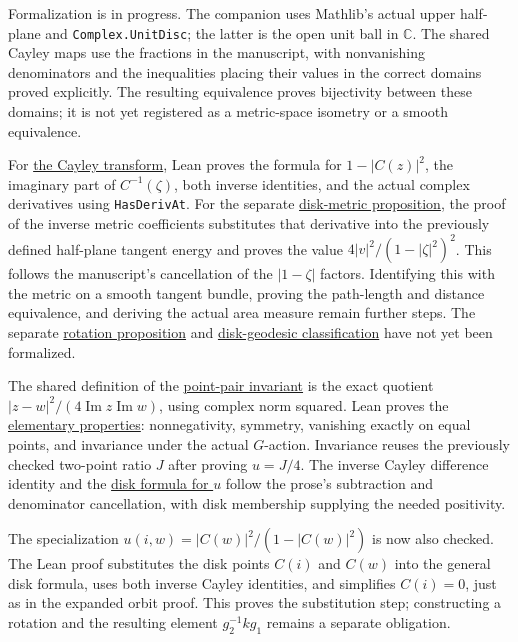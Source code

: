 Formalization is in progress. The companion uses Mathlib's actual upper half-plane and \texttt{Complex.UnitDisc}; the latter is the open unit ball in $\mathbb C$. The shared Cayley maps use the fractions in the manuscript, with nonvanishing denominators and the inequalities placing their values in the correct domains proved explicitly. The resulting equivalence proves bijectivity between these domains; it is not yet registered as a metric-space isometry or a smooth equivalence.

For \hyperref[hyperbolic.cayley]{the Cayley transform}, Lean proves the formula for $1-|C(z)|^2$, the imaginary part of $C^{-1}(\zeta)$, both inverse identities, and the actual complex derivatives using \texttt{HasDerivAt}. For the separate \hyperref[hyperbolic.disk-metric]{disk-metric proposition}, the proof of the inverse metric coefficients substitutes that derivative into the previously defined half-plane tangent energy and proves the value $4|v|^2/(1-|\zeta|^2)^2$. This follows the manuscript's cancellation of the $|1-\zeta|$ factors. Identifying this with the metric on a smooth tangent bundle, proving the path-length and distance equivalence, and deriving the actual area measure remain further steps. The separate \hyperref[hyperbolic.disk-rotations]{rotation proposition} and \hyperref[hyperbolic.disk-geodesics]{disk-geodesic classification} have not yet been formalized.

The shared definition of the \hyperref[hyperbolic.point-pair]{point-pair invariant} is the exact quotient $|z-w|^2/(4\operatorname{Im}z\operatorname{Im}w)$, using complex norm squared. Lean proves the \hyperref[hyperbolic.point-pair-properties]{elementary properties}: nonnegativity, symmetry, vanishing exactly on equal points, and invariance under the actual $G$-action. Invariance reuses the previously checked two-point ratio $J$ after proving $u=J/4$. The inverse Cayley difference identity and the \hyperref[hyperbolic.point-pair-disk]{disk formula for $u$} follow the prose's subtraction and denominator cancellation, with disk membership supplying the needed positivity.

The specialization $u(i,w)=|C(w)|^2/(1-|C(w)|^2)$ is now also checked. The Lean proof substitutes the disk points $C(i)$ and $C(w)$ into the general disk formula, uses both inverse Cayley identities, and simplifies $C(i)=0$, just as in the expanded orbit proof. This proves the substitution step; constructing a rotation and the resulting element $g_2^{-1}kg_1$ remains a separate obligation.

